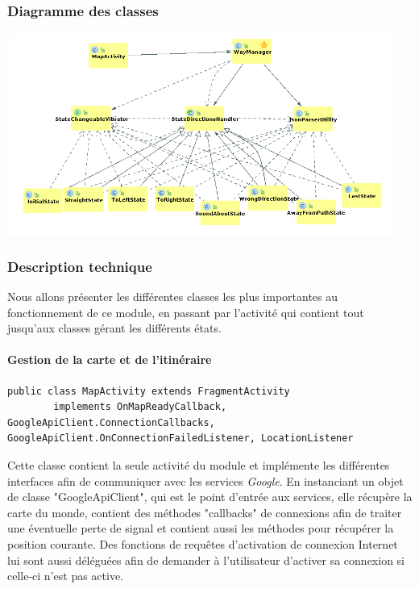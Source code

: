 \newpage
\subsubsection{Diagramme des classes}
\begin{center}
\includegraphics[height=250px]{Assets/mapUML.png}
\label{mapUML}
\end{center}

\subsubsection{Description technique}

Nous allons présenter les différentes classes les plus importantes au fonctionnement de ce module, en passant par l'activité qui contient tout jusqu'aux classes gérant les différents états.
\paragraph{Gestion de la carte et de l'itinéraire}

\begin{lstlisting}
public class MapActivity extends FragmentActivity
        implements OnMapReadyCallback, GoogleApiClient.ConnectionCallbacks, GoogleApiClient.OnConnectionFailedListener, LocationListener 
\end{lstlisting}

Cette classe contient la seule activité du module et implémente les différentes interfaces afin de communiquer avec les services \emph{Google}. En instanciant un objet de classe "GoogleApiClient", qui est le point d'entrée aux services, elle récupère la carte du monde, contient des méthodes "callbacks" de connexions afin de traiter une éventuelle perte de signal et contient aussi les méthodes pour récupérer la position courante. Des fonctions de requêtes d'activation de connexion Internet lui sont aussi déléguées afin de demander à l'utilisateur d'activer sa connexion si celle-ci n'est pas active.

